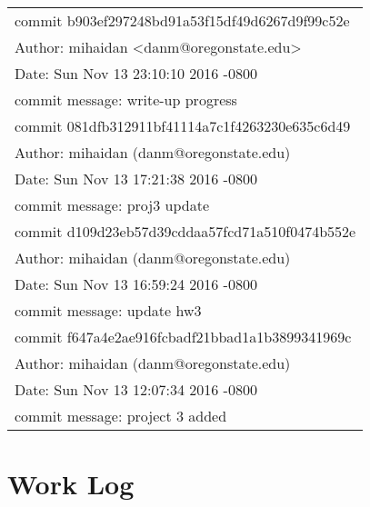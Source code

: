 \documentclass[letterpaper,10pt,onecolumn]{IEEEtran}
\begin{document}
        \begin{center}
        \def\arraystretch{1.1}
        \begin{tabular}{ | p{8cm} | }
            \hline
            commit b903ef297248bd91a53f15df49d6267d9f99c52e \\
            Author: mihaidan <danm@oregonstate.edu> \\
            Date:   Sun Nov 13 23:10:10 2016 -0800 \\
            commit message: write-up progress \\
            \hline
            commit 081dfb312911bf41114a7c1f4263230e635c6d49 \\
            Author: mihaidan (danm@oregonstate.edu) \\
            Date:   Sun Nov 13 17:21:38 2016 -0800 \\
            commit message: proj3 update \\
            \hline
            commit d109d23eb57d39cddaa57fcd71a510f0474b552e \\
            Author: mihaidan (danm@oregonstate.edu) \\ 
            Date:   Sun Nov 13 16:59:24 2016 -0800 \\
            commit message: update hw3 \\
            \hline
            commit f647a4e2ae916fcbadf21bbad1a1b3899341969c \\
            Author: mihaidan (danm@oregonstate.edu) \\
            Date:   Sun Nov 13 12:07:34 2016 -0800 \\
            commit message: project 3 added \\
            \hline
        \end{tabular}
        \end{center}


    
    \vspace{6mm}
    
    
    \section*{Work Log}
    
\end{document}
